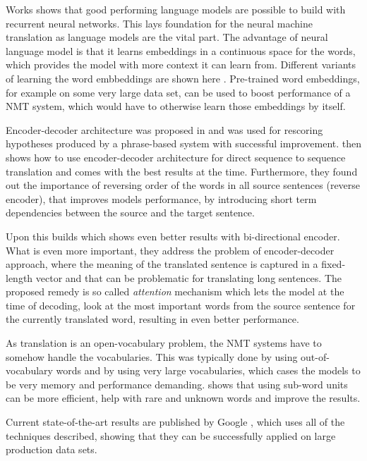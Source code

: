 \documentclass{ExcelAtFIT}
\begin{document}
Works \cite{neuralLanguageModels, neuralLanguageModels2, mikolovphd} shows that good performing language models are possible to build with recurrent neural networks. This lays foundation for the neural machine translation as language models are the vital part. The advantage of neural language model is that it learns embeddings in a continuous space for the words, which provides the model with more context it can learn from. Different variants of learning the word embbeddings are shown here \cite{word2vec,kingQueen,glove,fasttext}. Pre-trained word  embeddings, for example on some very large data set, can be used to boost performance of a NMT system, which would have to otherwise learn those embeddings by itself.

Encoder-decoder architecture was proposed in \cite{encoderDecoder} and was used for rescoring hypotheses produced by a phrase-based system with successful improvement. \cite{seq2seq} then shows how to use encoder-decoder architecture for direct sequence to sequence translation and comes with the best results at the time. Furthermore, they found out the importance of reversing order of the words  in all source sentences (reverse encoder), that improves models performance, by introducing short term dependencies between the source and the target sentence.

Upon this builds \cite{attention} which shows even better results with bi-directional encoder. What is even more important, they address the problem of encoder-decoder approach, where the meaning of the translated sentence is captured in a fixed-length vector and that can be problematic for translating long sentences. The proposed remedy is so called \emph{attention} mechanism which lets the model at the time of decoding, look at the most important words from the source sentence for the currently translated word, resulting in even better performance.

As translation is an open-vocabulary problem, the NMT systems have to somehow handle the vocabularies. This was typically done by using out-of-vocabulary words and by using very large vocabularies, which cases the models to be very memory and performance demanding. \cite{mikolovSubwords, subwords} shows that using sub-word units can be more efficient, help with rare and unknown words and improve the results. 

Current state-of-the-art results are published by Google \cite{googleBridgingGap,googleAttention}, which uses all of the techniques described, showing that they can be successfully applied on large production data sets.
\end{document}
